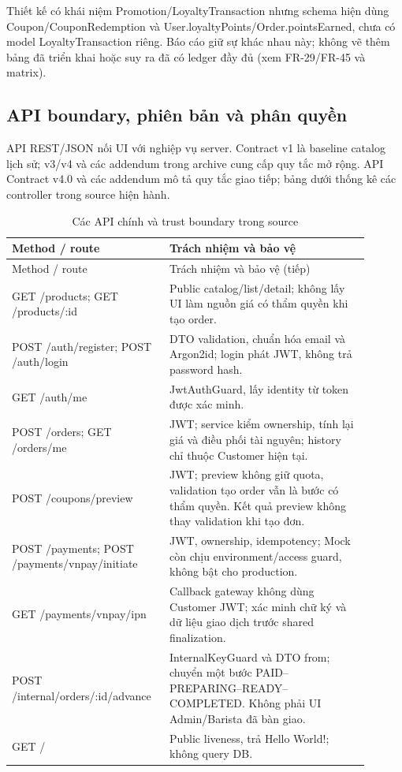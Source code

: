 Thiết kế có khái niệm Promotion/LoyaltyTransaction nhưng schema hiện dùng
Coupon/CouponRedemption và User.loyaltyPoints/Order.pointsEarned, chưa có
model LoyaltyTransaction riêng. Báo cáo giữ sự khác nhau này; không vẽ thêm
bảng đã triển khai hoặc suy ra đã có ledger đầy đủ (xem FR-29/FR-45 và matrix).

\subsection{API boundary, phiên bản và phân quyền}
API REST/JSON nối UI với nghiệp vụ server. Contract v1 là baseline catalog
lịch sử; v3/v4 và các addendum trong archive cung cấp quy tắc mở rộng.
API Contract v4.0 và các addendum mô tả quy tắc giao tiếp; bảng dưới thống kê các controller trong source hiện hành.

\begin{longtable}{>{\raggedright\arraybackslash}p{0.37\linewidth}>{\raggedright\arraybackslash}p{0.53\linewidth}}
\caption[Các API chính và trust boundary]{Các API chính và trust boundary trong source}\label{tab:api-inventory}\\
\toprule Method / route & Trách nhiệm và bảo vệ \\ \midrule
\endfirsthead
\toprule Method / route & Trách nhiệm và bảo vệ (tiếp) \\ \midrule \endhead
GET /products; GET /products/:id & Public catalog/list/detail; không lấy UI làm
nguồn giá có thẩm quyền khi tạo order. \\
POST /auth/register; POST /auth/login & DTO validation, chuẩn hóa email và
Argon2id; login phát JWT, không trả password hash. \\
GET /auth/me & JwtAuthGuard, lấy identity từ token được xác minh. \\
POST /orders; GET /orders/me & JWT; service kiểm ownership, tính lại giá và
điều phối tài nguyên; history chỉ thuộc Customer hiện tại. \\
POST /coupons/preview & JWT; preview không giữ quota, validation tạo order vẫn
là bước có thẩm quyền. Kết quả preview không thay validation khi tạo đơn. \\
POST /payments; POST /payments/vnpay/initiate & JWT, ownership, idempotency;
Mock còn chịu environment/access guard, không bật cho production. \\
GET /payments/vnpay/ipn & Callback gateway không dùng Customer JWT; xác minh
chữ ký và dữ liệu giao dịch trước shared finalization. \\
POST /internal/orders/:id/advance & InternalKeyGuard và DTO from; chuyển một
bước PAID--PREPARING--READY--COMPLETED. Không phải UI Admin/Barista đã bàn giao. \\
GET / & Public liveness, trả Hello World!; không query DB. \\
\bottomrule
\end{longtable}

